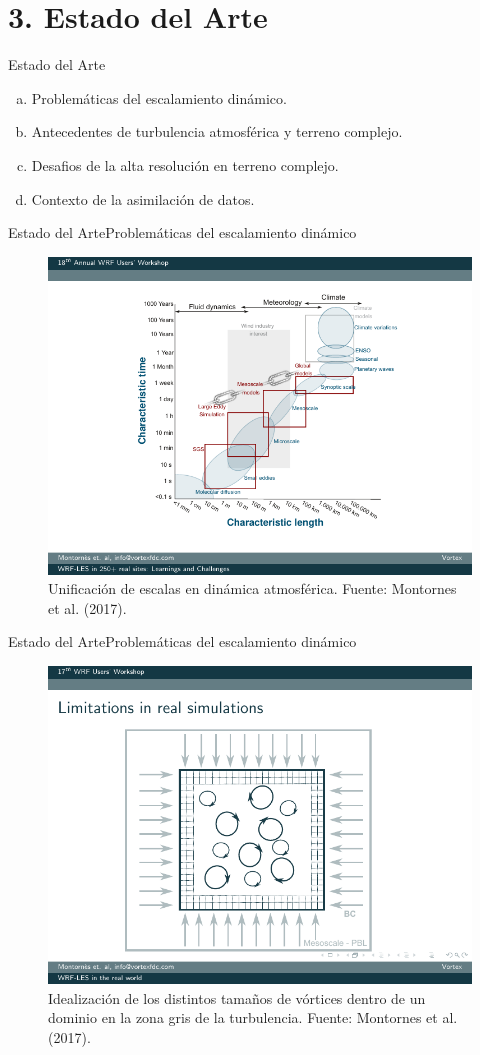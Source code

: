 \documentclass[mathserif]{beamer}
\begin{document}
\section{3. Estado del Arte}
\begin{frame}{Estado del Arte}
	\begin{enumerate}[a.]
		\item Problemáticas del escalamiento dinámico.
		\item Antecedentes de turbulencia atmosférica y terreno complejo.
		\item Desafios de la alta resolución en terreno complejo.
		\item Contexto de la asimilación de datos.
	\end{enumerate}
\end{frame}

\begin{frame}{Estado del Arte}{Problemáticas del escalamiento dinámico}
	\begin{figure}
		\centering
		\includegraphics[width=0.7\linewidth,trim={2.6cm 1.4cm 1.5cm 0.8cm},clip]{fig/02/escalas}
		\vspace{-2mm}
		\caption{Unificación de escalas en dinámica atmosférica. Fuente: Montornes et al. (2017).}
	\end{figure}
\end{frame}

\begin{frame}{Estado del Arte}{Problemáticas del escalamiento dinámico}
	\begin{figure}
		\centering
		\includegraphics[width=0.6\linewidth,trim={2.67cm 1.35cm 3.1cm 2.25cm},clip]{fig/02/grid}
		\caption{Idealización de los distintos tamaños de vórtices dentro de un dominio en la zona gris de la turbulencia. Fuente: Montornes et al. (2017).}
		\label{fig:02_grid_vortex}
	\end{figure}
\end{frame}
\end{document}

